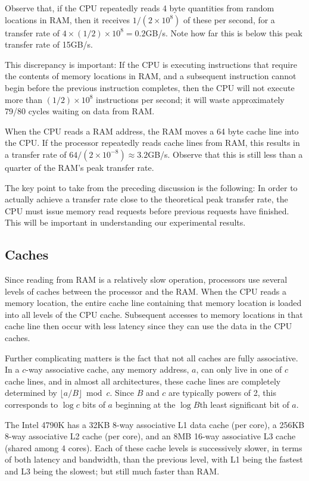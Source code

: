 \documentclass{patmorin}
\begin{document}
Observe that, if the CPU repeatedly reads 4 byte quantities from random
locations in RAM, then it receives $1/(2\times 10^8)$ of these per second,
for a transfer rate of $4\times(1/2)\times10^8=0.2$GB/s.  Note how far
this is below this peak transfer rate of 15GB/s.

This discrepancy is important: If the CPU is executing instructions
that require the contents of memory locations in RAM, and a subsequent
instruction cannot begin before the previous instruction completes, then
the CPU will not execute more than $(1/2)\times 10^8$ instructions per
second; it will waste approximately 79/80 cycles waiting on data from RAM.

When the CPU reads a RAM address, the RAM moves a 64 byte cache line into
the CPU.  If the processor repeatedly reads cache lines from RAM, this
results in a transfer rate of $64 / (2\times10^{-8}) \approx 3.2$GB/s.
Observe that this is still less than a quarter of the RAM's peak transfer
rate.

The key point to take from the preceding discussion is the following: In
order to actually achieve a transfer rate close to the theoretical peak
transfer rate, the CPU must issue memory read requests before previous
requests have finished.  This will be important in understanding our
experimental results.

\subsection{Caches}

Since reading from RAM is a relatively slow operation, processors use
several levels of caches between the processor and the RAM.  When the
CPU reads a memory location, the entire cache line containing that memory
location is loaded into all levels of the CPU cache.  Subsequent accesses
to memory locations in that cache line then occur with less latency
since they can use the data in the CPU caches.

Further complicating matters is the fact that not all caches are fully
associative.  In a $c$-way associative cache, any memory address, $a$,
can only live in one of $c$ cache lines, and in almost all architectures,
these cache lines are completely determined by $\lfloor a/B\rfloor
\bmod c$.  Since $B$ and $c$ are typically powers of 2, this corresponds
to $\log c$ bits of $a$ beginning at the $\log B$th least significant
bit of $a$.

The Intel 4790K has a 32KB 8-way associative L1 data cache (per core),
a 256KB 8-way associative L2 cache (per core), and an 8MB 16-way
associative L3 cache (shared among 4 cores).  Each of these cache levels
is successively slower, in terms of both latency and bandwidth, than
the previous level, with L1 being the fastest and L3 being the slowest;
but still much faster than RAM.
\end{document}
